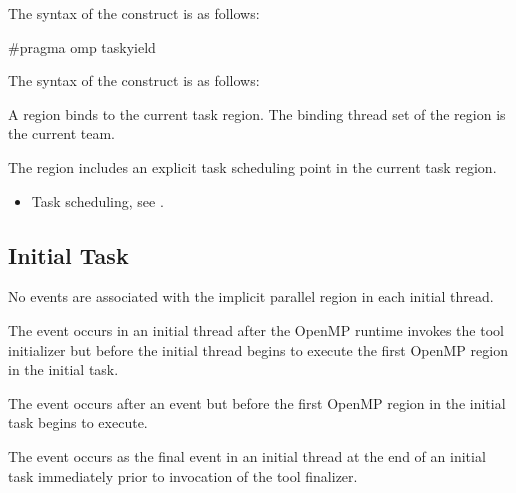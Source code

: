 \syntax
\begin{ccppspecific}
The syntax of the  construct is as follows:

\begin{ompcPragma}
#pragma omp taskyield 
\end{ompcPragma}
\end{ccppspecific}

\begin{fortranspecific}
The syntax of the  construct is as follows:

\end{fortranspecific}

\binding
A  region binds to the current task region. The binding thread set of the
 region is the current team.

\descr
The  region includes an explicit task scheduling point in the current task
region.

\crossreferences
\begin{itemize}
\item Task scheduling, see
.
\end{itemize}











\subsection{Initial Task}

\events
No events are associated with the implicit parallel region in each initial thread.

The  event occurs in an initial thread after the OpenMP runtime invokes the tool initializer
but before the initial thread begins to execute the first OpenMP region in the initial task.

The  event occurs after an  event
but before the first OpenMP region in the initial task begins to execute.

The  event occurs as the final event in an initial thread at the end of an initial task
immediately prior to invocation of the tool finalizer.


